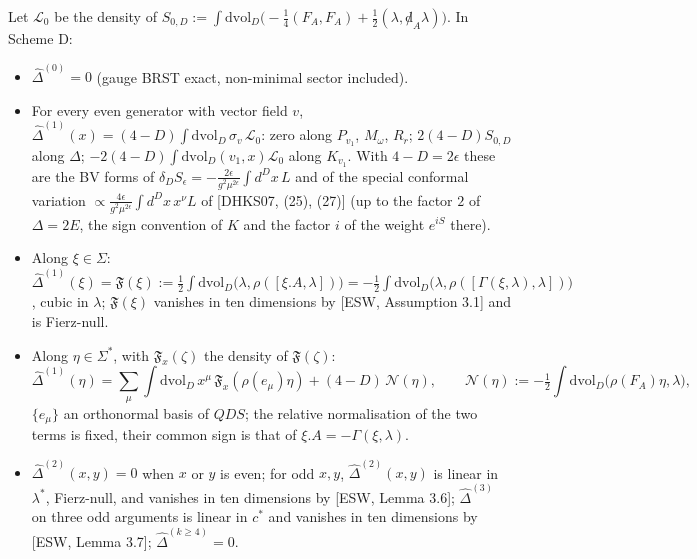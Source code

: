 \begin{theorem}
\label{thm:breakD}
Let $\mathscr L_0$ be the density of $S_{0,D}:=\int\mathrm{dvol}_D\big(-\frac14(F_A,F_A)+\frac12(\lambda,{\not d}_A\lambda)\big)$. In Scheme D:
\begin{itemize}
\item[(i)] $\widehat\Delta^{(0)}=0$ (gauge BRST exact, non-minimal sector included).
\item[(ii)] For every even generator with vector field $v$, $\widehat\Delta^{(1)}(x)=(4-D)\int\mathrm{dvol}_D\,\sigma_v\,\mathscr L_0$: zero along $P_{v_1}$, $M_\omega$, $R_r$; $2(4-D)S_{0,D}$ along $\Delta$; $-2(4-D)\int\mathrm{dvol}_D(v_1,x)\mathscr L_0$ along $K_{v_1}$. With $4-D=2\epsilon$ these are the BV forms of $\delta_DS_\epsilon=-\frac{2\epsilon}{g^2\mu^{2\epsilon}}\int d^Dx\,L$ and of the special conformal variation $\propto\frac{4\epsilon}{g^2\mu^{2\epsilon}}\int d^Dx\,x^\nu L$ of [DHKS07, (25), (27)] (up to the factor $2$ of $\Delta=2E$, the sign convention of $K$ and the factor $i$ of the weight $e^{iS}$ there).
\item[(iii)] Along $\xi\in\Sigma$: $\widehat\Delta^{(1)}(\xi)=\mathfrak F(\xi):=\frac12\int\mathrm{dvol}_D\big(\lambda,\rho([\xi.A,\lambda])\big)=-\frac12\int\mathrm{dvol}_D\big(\lambda,\rho([\Gamma(\xi,\lambda),\lambda])\big)$, cubic in $\lambda$; $\mathfrak F(\xi)$ vanishes in ten dimensions by [ESW, Assumption 3.1] and is Fierz-null.
\item[(iv)] Along $\eta\in\Sigma^*$, with $\mathfrak F_x(\zeta)$ the density of $\mathfrak F(\zeta)$:
\[
\widehat\Delta^{(1)}(\eta)=\sum_{\mu}\int\mathrm{dvol}_D\,x^\mu\,\mathfrak F_x(\rho(e_\mu)\eta)+(4-D)\,\mathcal N(\eta),\qquad \mathcal N(\eta):=-\tfrac12\int\mathrm{dvol}_D\big(\rho(F_A)\eta,\lambda\big),
\]
$\{e_\mu\}$ an orthonormal basis of $QDS$; the relative normalisation of the two terms is fixed, their common sign is that of $\xi.A=-\Gamma(\xi,\lambda)$.
\item[(v)] $\widehat\Delta^{(2)}(x,y)=0$ when $x$ or $y$ is even; for odd $x,y$, $\widehat\Delta^{(2)}(x,y)$ is linear in $\lambda^*$, Fierz-null, and vanishes in ten dimensions by [ESW, Lemma 3.6]; $\widehat\Delta^{(3)}$ on three odd arguments is linear in $c^*$ and vanishes in ten dimensions by [ESW, Lemma 3.7]; $\widehat\Delta^{(k\ge4)}=0$.
\end{itemize}
\end{theorem}

